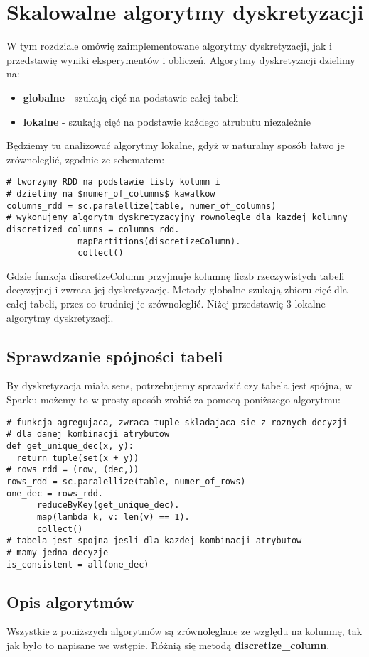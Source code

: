 \documentclass[magisterska]{pracamgr}
\theoremstyle{plain}
\theoremstyle{definition}
\theoremstyle{remark}
\begin{document}
\chapter{Skalowalne algorytmy dyskretyzacji}

W tym rozdziale omówię zaimplementowane algorytmy dyskretyzacji, jak i przedstawię wyniki eksperymentów i obliczeń.
Algorytmy dyskretyzacji dzielimy na:
\begin{itemize}
 \item \textbf{globalne} - szukają cięć na podstawie całej tabeli
 \item \textbf{lokalne} - szukają cięć na podstawie każdego atrubutu niezależnie
\end{itemize}
Będziemy tu analizować algorytmy lokalne, gdyż
w naturalny sposób łatwo je zrównoleglić, zgodnie ze schematem:
\begin{lstlisting}
# tworzymy RDD na podstawie listy kolumn i 
# dzielimy na $numer_of_columns$ kawalkow
columns_rdd = sc.paralellize(table, numer_of_columns)
# wykonujemy algorytm dyskretyzacyjny rownolegle dla kazdej kolumny
discretized_columns = columns_rdd.
		      mapPartitions(discretizeColumn).
		      collect()
\end{lstlisting}
Gdzie funkcja discretizeColumn przyjmuje kolumnę liczb rzeczywistych tabeli decyzyjnej i zwraca
jej dyskretyzację.
Metody globalne szukają zbioru cięć dla całej tabeli, przez co trudniej je zrównoleglić.
Niżej przedstawię 3 lokalne algorytmy dyskretyzacji.

\section{Sprawdzanie spójności tabeli}
By dyskretyzacja miała sens, potrzebujemy sprawdzić czy tabela jest spójna, w Sparku możemy 
to w prosty sposób zrobić za pomocą poniższego algorytmu:
\begin{lstlisting}
# funkcja agregujaca, zwraca tuple skladajaca sie z roznych decyzji
# dla danej kombinacji atrybutow
def get_unique_dec(x, y):
  return tuple(set(x + y))
# rows_rdd = (row, (dec,))
rows_rdd = sc.paralellize(table, numer_of_rows)
one_dec = rows_rdd.
	  reduceByKey(get_unique_dec).
	  map(lambda k, v: len(v) == 1).
	  collect()
# tabela jest spojna jesli dla kazdej kombinacji atrybutow
# mamy jedna decyzje
is_consistent = all(one_dec)
\end{lstlisting}
\section{Opis algorytmów}
Wszystkie z poniższych algorytmów są zrównoleglane ze względu na kolumnę, tak 
jak było to napisane we wstępie. Różnią się metodą \textbf{discretize\_column}.
\end{document}
